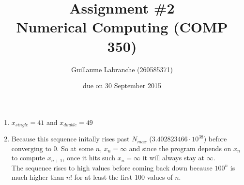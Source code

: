 \documentclass{article}
\author{Guillaume Labranche (260585371)}
\title{Assignment \#2\\Numerical Computing (COMP 350)}
\date{due on 30 September 2015}
\begin{document}
\maketitle
 
\begin{enumerate}%

\item $x_{single} = 41$ and $x_{double} = 49$

\item Because this sequence initally rises past $N_{max}$ ($3.402823466 \cdot 10^{38}$) before converging to $0$. So at some $n$, $x_n = \infty$ and since the program depends on $x_n$ to compute $x_{n+1}$, once it hits such $x_n = \infty$ it will always stay at $\infty$. \\
The sequence rises to high values before coming back down because $100^n$ is much higher than $n!$ for at least the first 100 values of $n$.

\end{enumerate}
\end{document}
